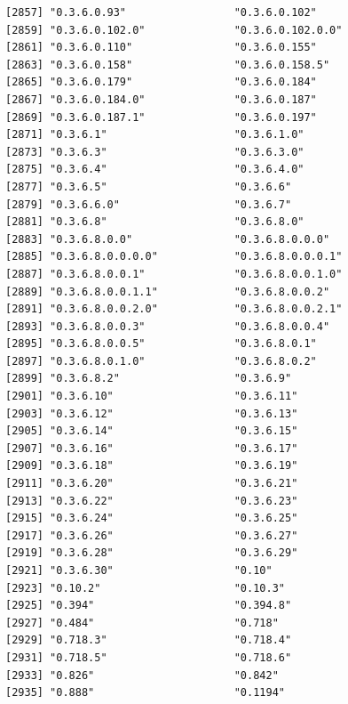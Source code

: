 \documentclass[
  letterpaper,
  DIV=11,
  numbers=noendperiod]{scrreprt}
\begin{document}
\begin{verbatim}
[2857] "0.3.6.0.93"                 "0.3.6.0.102"               
[2859] "0.3.6.0.102.0"              "0.3.6.0.102.0.0"           
[2861] "0.3.6.0.110"                "0.3.6.0.155"               
[2863] "0.3.6.0.158"                "0.3.6.0.158.5"             
[2865] "0.3.6.0.179"                "0.3.6.0.184"               
[2867] "0.3.6.0.184.0"              "0.3.6.0.187"               
[2869] "0.3.6.0.187.1"              "0.3.6.0.197"               
[2871] "0.3.6.1"                    "0.3.6.1.0"                 
[2873] "0.3.6.3"                    "0.3.6.3.0"                 
[2875] "0.3.6.4"                    "0.3.6.4.0"                 
[2877] "0.3.6.5"                    "0.3.6.6"                   
[2879] "0.3.6.6.0"                  "0.3.6.7"                   
[2881] "0.3.6.8"                    "0.3.6.8.0"                 
[2883] "0.3.6.8.0.0"                "0.3.6.8.0.0.0"             
[2885] "0.3.6.8.0.0.0.0"            "0.3.6.8.0.0.0.1"           
[2887] "0.3.6.8.0.0.1"              "0.3.6.8.0.0.1.0"           
[2889] "0.3.6.8.0.0.1.1"            "0.3.6.8.0.0.2"             
[2891] "0.3.6.8.0.0.2.0"            "0.3.6.8.0.0.2.1"           
[2893] "0.3.6.8.0.0.3"              "0.3.6.8.0.0.4"             
[2895] "0.3.6.8.0.0.5"              "0.3.6.8.0.1"               
[2897] "0.3.6.8.0.1.0"              "0.3.6.8.0.2"               
[2899] "0.3.6.8.2"                  "0.3.6.9"                   
[2901] "0.3.6.10"                   "0.3.6.11"                  
[2903] "0.3.6.12"                   "0.3.6.13"                  
[2905] "0.3.6.14"                   "0.3.6.15"                  
[2907] "0.3.6.16"                   "0.3.6.17"                  
[2909] "0.3.6.18"                   "0.3.6.19"                  
[2911] "0.3.6.20"                   "0.3.6.21"                  
[2913] "0.3.6.22"                   "0.3.6.23"                  
[2915] "0.3.6.24"                   "0.3.6.25"                  
[2917] "0.3.6.26"                   "0.3.6.27"                  
[2919] "0.3.6.28"                   "0.3.6.29"                  
[2921] "0.3.6.30"                   "0.10"                      
[2923] "0.10.2"                     "0.10.3"                    
[2925] "0.394"                      "0.394.8"                   
[2927] "0.484"                      "0.718"                     
[2929] "0.718.3"                    "0.718.4"                   
[2931] "0.718.5"                    "0.718.6"                   
[2933] "0.826"                      "0.842"                     
[2935] "0.888"                      "0.1194"                    

\end{verbatim}
\end{document}
